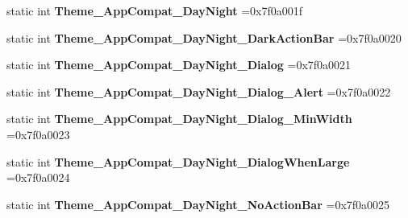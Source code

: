 \begin{DoxyCompactItemize}
static int {\bfseries Theme\+\_\+\+App\+Compat\+\_\+\+Day\+Night} =0x7f0a001f
\item 
\mbox{\label{classandroid_1_1support_1_1graphics_1_1drawable_1_1animated_1_1R_1_1style_abed332e61fededf69bc4e8e4abab28fd}} 
static int {\bfseries Theme\+\_\+\+App\+Compat\+\_\+\+Day\+Night\+\_\+\+Dark\+Action\+Bar} =0x7f0a0020
\item 
\mbox{\label{classandroid_1_1support_1_1graphics_1_1drawable_1_1animated_1_1R_1_1style_a31809528492829a56f9992d83b0c1cff}} 
static int {\bfseries Theme\+\_\+\+App\+Compat\+\_\+\+Day\+Night\+\_\+\+Dialog} =0x7f0a0021
\item 
\mbox{\label{classandroid_1_1support_1_1graphics_1_1drawable_1_1animated_1_1R_1_1style_a05cf8496f17ec851b95fd92ffa2b8d22}} 
static int {\bfseries Theme\+\_\+\+App\+Compat\+\_\+\+Day\+Night\+\_\+\+Dialog\+\_\+\+Alert} =0x7f0a0022
\item 
\mbox{\label{classandroid_1_1support_1_1graphics_1_1drawable_1_1animated_1_1R_1_1style_a4aba7620395f769958f9b45bd3252dd9}} 
static int {\bfseries Theme\+\_\+\+App\+Compat\+\_\+\+Day\+Night\+\_\+\+Dialog\+\_\+\+Min\+Width} =0x7f0a0023
\item 
\mbox{\label{classandroid_1_1support_1_1graphics_1_1drawable_1_1animated_1_1R_1_1style_a7b93217353dbd62f3238445718e21d3c}} 
static int {\bfseries Theme\+\_\+\+App\+Compat\+\_\+\+Day\+Night\+\_\+\+Dialog\+When\+Large} =0x7f0a0024
\item 
\mbox{\label{classandroid_1_1support_1_1graphics_1_1drawable_1_1animated_1_1R_1_1style_a7909c319c26b889a9ee50aca03571725}} 
static int {\bfseries Theme\+\_\+\+App\+Compat\+\_\+\+Day\+Night\+\_\+\+No\+Action\+Bar} =0x7f0a0025
\item 
\mbox{\label{classandroid_1_1support_1_1graphics_1_1drawable_1_1animated_1_1R_1_1style_aca8438bd904f27411b093a4d547ef005}} 

\end{DoxyCompactItemize}
